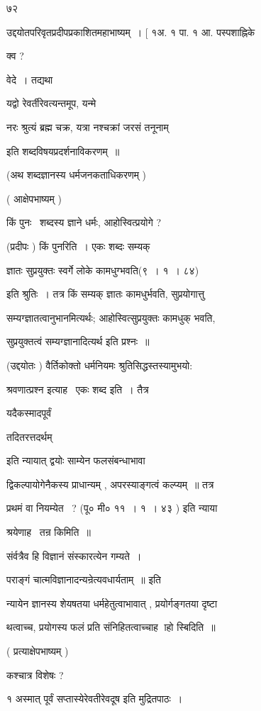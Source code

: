 \documentclass[11pt, openany]{book}
\begin{document}
७२ 

उद्दयोतपरिवृतप्रदीपप्रकाशितमहाभाष्यम्~। [ १अ. १ पा. १ आ. पस्पशाह्निके




क्व ? 

वेदे~। तद्यथा \textendash\ {\qt यद्वो रेवर्तीरेवत्यन्तमूप, यन्मे 

नरः श्रुत्यं ब्रह्म चक्र, यत्रा नश्चक्रां जरसं तनूनाम्} 

इति शब्दविषयप्रदर्शनाविकरणम्~॥ 

(अथ शब्दज्ञानस्य धर्मजनकताधिकरणम् ) 

( आक्षेपभाष्यम् ) 

किं पुनः \textendash\ शब्दस्य ज्ञाने धर्मः, आहोस्वित्प्रयोगे ? 

(प्रदीपः ) किं पुनरिति~। एकः शब्दः सम्यक् 

ज्ञातः सुप्रयुक्तः स्वर्गे लोके कामधुग्भवति(९~। १~। ८४) 

इति श्रुतिः~। तत्र किं सम्यक् ज्ञातः कामधुर्भवति, सुप्रयोगात्तु 

सम्यग्ज्ञातत्वानुभानमित्यर्थः; आहोस्वित्सुप्रयुक्तः कामधुक् भवति, 

सुप्रयुक्तत्वं सम्यग्ज्ञानादित्यर्थ इति प्रश्नः~॥ 

(उद्दयोतः ) वैर्तिकोक्तो धर्मनियमः श्रुतिसिद्धस्तस्यामुभयो: 

श्रवणात्प्रश्न इत्याह \textendash\ एकः शब्द इति~। तैत्र {\qt यदैकस्मादपूर्वं 

तदितरत्तदर्थम्} इति न्यायात् द्वयोः साम्येन फलसंबन्धाभावा \textendash\ 

द्विकल्पायोगेनैकस्य प्राधान्यम् , अपरस्याङ्गत्वं कल्प्यम्~॥ तत्र 

{\qt प्रथमं वा नियम्येत \textendash\ }? (पू० मी० ११~। १~। ४३ ) इति न्याया \textendash\ 

श्रयेणाह \textendash\ तन्र किमिति~॥ 

संर्वत्रैव हि विज्ञानं संस्कारत्येन गम्यते~। 

पराङ्गं चात्मविज्ञानादन्यन्रेत्यवधार्यताम्~॥ इति \textendash\ 

न्यायेन ज्ञानस्य शेयषतया धर्महेतुत्वाभावात् , प्रयोर्गङ्गतया दृष्टा \textendash\ 

थत्वाच्च, प्रयोगस्य फलं प्रति संनिहितत्वाच्चाह \textendash\ ाहो स्बिदिति~॥ 

( प्रत्याक्षेपभाष्यम् ) 

कश्चात्र विशेषः ? 



१ अस्मात् पूर्वं सप्तास्येरेवतीरेवदूष इति मुद्रितपाठः~। 
\end{document}

